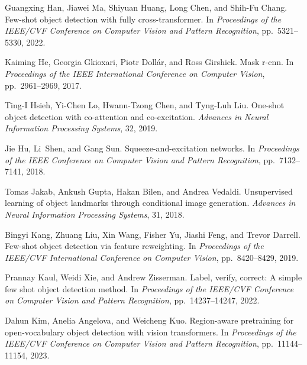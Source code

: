 \begin{thebibliography}{52}
Guangxing Han, Jiawei Ma, Shiyuan Huang, Long Chen, and Shih-Fu Chang.
\newblock Few-shot object detection with fully cross-transformer.
\newblock In \emph{Proceedings of the IEEE/CVF Conference on Computer Vision
  and Pattern Recognition}, pp.\  5321--5330, 2022{}.

Kaiming He, Georgia Gkioxari, Piotr Doll{\'a}r, and Ross Girshick.
\newblock Mask r-cnn.
\newblock In \emph{Proceedings of the IEEE International Conference on Computer
  Vision}, pp.\  2961--2969, 2017.

Ting-I Hsieh, Yi-Chen Lo, Hwann-Tzong Chen, and Tyng-Luh Liu.
\newblock One-shot object detection with co-attention and co-excitation.
\newblock \emph{Advances in Neural Information Processing Systems}, 32, 2019.

Jie Hu, Li~Shen, and Gang Sun.
\newblock Squeeze-and-excitation networks.
\newblock In \emph{Proceedings of the IEEE Conference on Computer Vision and
  Pattern Recognition}, pp.\  7132--7141, 2018.

Tomas Jakab, Ankush Gupta, Hakan Bilen, and Andrea Vedaldi.
\newblock Unsupervised learning of object landmarks through conditional image
  generation.
\newblock \emph{Advances in Neural Information Processing Systems}, 31, 2018.

Bingyi Kang, Zhuang Liu, Xin Wang, Fisher Yu, Jiashi Feng, and Trevor Darrell.
\newblock Few-shot object detection via feature reweighting.
\newblock In \emph{Proceedings of the IEEE/CVF International Conference on
  Computer Vision}, pp.\  8420--8429, 2019.

Prannay Kaul, Weidi Xie, and Andrew Zisserman.
\newblock Label, verify, correct: A simple few shot object detection method.
\newblock In \emph{Proceedings of the IEEE/CVF Conference on Computer Vision
  and Pattern Recognition}, pp.\  14237--14247, 2022.

Dahun Kim, Anelia Angelova, and Weicheng Kuo.
\newblock Region-aware pretraining for open-vocabulary object detection with
  vision transformers.
\newblock In \emph{Proceedings of the IEEE/CVF Conference on Computer Vision
  and Pattern Recognition}, pp.\  11144--11154, 2023.


\end{thebibliography}
